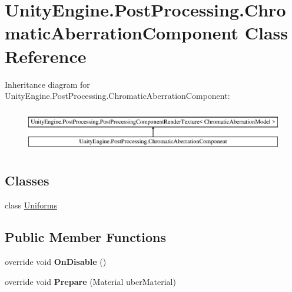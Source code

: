 \hypertarget{class_unity_engine_1_1_post_processing_1_1_chromatic_aberration_component}{}\section{Unity\+Engine.\+Post\+Processing.\+Chromatic\+Aberration\+Component Class Reference}
\label{class_unity_engine_1_1_post_processing_1_1_chromatic_aberration_component}
Inheritance diagram for Unity\+Engine.\+Post\+Processing.\+Chromatic\+Aberration\+Component\+:\begin{figure}[H]
\begin{center}
\leavevmode
\includegraphics[height=1.895093cm]{class_unity_engine_1_1_post_processing_1_1_chromatic_aberration_component}
\end{center}
\end{figure}
\subsection*{Classes}
\begin{DoxyCompactItemize}
\item 
class \hyperlink{class_unity_engine_1_1_post_processing_1_1_chromatic_aberration_component_1_1_uniforms}{Uniforms}
\end{DoxyCompactItemize}
\subsection*{Public Member Functions}
\begin{DoxyCompactItemize}
\item 
\mbox{\label{class_unity_engine_1_1_post_processing_1_1_chromatic_aberration_component_aa88d860317b08f10454a6021dce03069}} 
override void {\bfseries On\+Disable} ()
\item 
\mbox{\label{class_unity_engine_1_1_post_processing_1_1_chromatic_aberration_component_acbf442cadd4fcb16e9008ecfd32698fa}} 
override void {\bfseries Prepare} (Material uber\+Material)
\end{DoxyCompactItemize}

